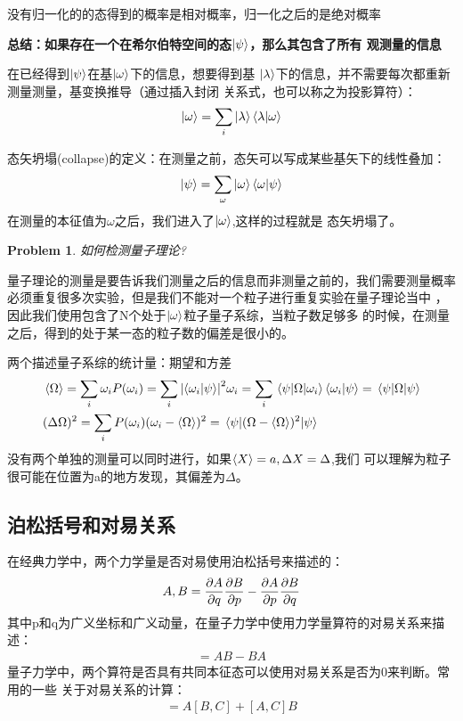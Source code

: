 \documentclass[UTF8]{article}
\numberwithin{equation}{section}
\newtheorem*{problem}{Problem}
\begin{document}
\begin{tcolorbox}[
    colframe = blue,
    title = 相对概率和绝对概率的区别
]
   没有归一化的的态得到的概率是相对概率，归一化之后的是绝对概率 
\end{tcolorbox}
\noindent \textbf{总结：如果存在一个在希尔伯特空间的态$\ket{\psi}$，那么其包含了所有
观测量的信息}

在已经得到$\ket{\psi}$在基$\ket{\omega}$下的信息，想要得到基
$\ket{\lambda}$下的信息，并不需要每次都重新测量测量，基变换推导（通过插入封闭
关系式，也可以称之为投影算符）：
\begin{align*}
    \ket{\omega} = \sum_i \ket{\lambda}\bra{\lambda}\ket{\omega}
\end{align*}

态矢坍塌(collapse)的定义：在测量之前，态矢可以写成某些基矢下的线性叠加：
\begin{align*}
    \ket{\psi}=\sum_\omega \ket{\omega}\braket{\omega}{\psi}
\end{align*}
\noindent 在测量的本征值为$\omega$之后，我们进入了$\ket{\omega}$,这样的过程就是
态矢坍塌了。

\begin{tcolorbox}[
    opacityback = 1
]
    \begin{problem}
    如何检测量子理论?
    \end{problem}
量子理论的测量是要告诉我们测量之后的信息而非测量之前的，我们需要测量概率
必须重复很多次实验，但是我们不能对一个粒子进行重复实验在量子理论当中
，因此我们使用包含了N个处于$\ket{\omega}$粒子量子系综，当粒子数足够多
的时候，在测量之后，得到的处于某一态的粒子数的偏差是很小的。
\end{tcolorbox}


两个描述量子系综的统计量：期望和方差
\begin{align*}
     & \expval{\Omega}=\sum_i \omega_i P(\omega_i)=\sum_i \abs{\braket{\omega_i}{\psi}}^2\omega_i
    =\sum_i\mel{\psi}{\Omega}{\omega_i}\braket{\omega_i}{\psi}=\mel{\psi}{\Omega}{\psi}           \\
     & (\Delta \Omega)^2=\sum_i P(\omega_i)(\omega_i-\expval{\Omega})^2
    =\mel{\psi}{(\Omega-\expval{\Omega})^2}{\psi}
\end{align*}
没有两个单独的测量可以同时进行，如果$\expval{X}=a,\Delta X=\Delta$,我们
可以理解为粒子很可能在位置为a的地方发现，其偏差为$\Delta$。
\subsection{泊松括号和对易关系}
在经典力学中，两个力学量是否对易使用泊松括号来描述的：
\begin{align*}
    {A,B} = \pdv{A}{q}\pdv{B}{p}-\pdv{A}{p}\pdv{B}{q}
\end{align*}
其中p和q为广义坐标和广义动量，在量子力学中使用力学量算符的对易关系来描述：
\begin{align*}
    [A,B] = AB-BA
\end{align*}
量子力学中，两个算符是否具有共同本征态可以使用对易关系是否为0来判断。常用的一些
关于对易关系的计算：
\begin{align*}
    [AB,C] = A[B,C]+[A,C]B
\end{align*}
\end{document}
